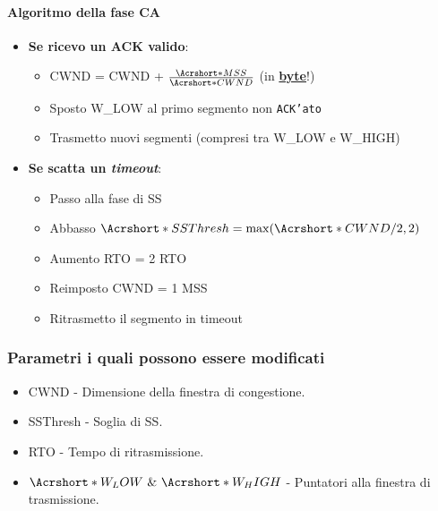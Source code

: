             \paragraph{Algoritmo della fase \Acrlong*{CA}}
            \begin{itemize}
                \item \textbf{Se ricevo un \Acrshort*{ACK} valido}:\begin{itemize}
                        \item \Acrshort*{CWND} = \Acrshort*{CWND} + $ \frac{\Acrshort*{MSS}}{\Acrshort*{CWND}} $ (in \underline{\textbf{byte}}!)
                        \item Sposto \Acrshort*{W_LOW} al primo segmento non \texttt{ACK'ato}
                        \item Trasmetto nuovi segmenti (compresi tra \Acrshort*{W_LOW} e \Acrshort*{W_HIGH})
                    \end{itemize}
                \item \textbf{Se scatta un \textit{timeout}}: \begin{itemize}
                        \item Passo alla fase di \Acrlong*{SS}
                        \item Abbasso $ \Acrshort*{SSThresh} = \max(\Acrshort*{CWND}/2, 2) $
                        \item Aumento \Acrshort*{RTO} = 2 \Acrshort*{RTO}
                        \item Reimposto \Acrshort*{CWND} = 1 \Acrshort*{MSS}
                        \item Ritrasmetto il segmento in timeout
                \end{itemize}
            \end{itemize}
        \subsubsection{Parametri i quali possono essere modificati}
            \begin{itemize}
                \item \acrfull*{CWND} -  Dimensione della finestra di congestione.
                \item \acrfull*{SSThresh} - Soglia di \Acrlong*{SS}.
                \item \acrfull*{RTO} - Tempo di ritrasmissione.
                \item \textbf{$\Acrshort*{W_LOW}\ \&\ \Acrshort*{W_HIGH}$} - Puntatori alla finestra di trasmissione.
            \end{itemize}
